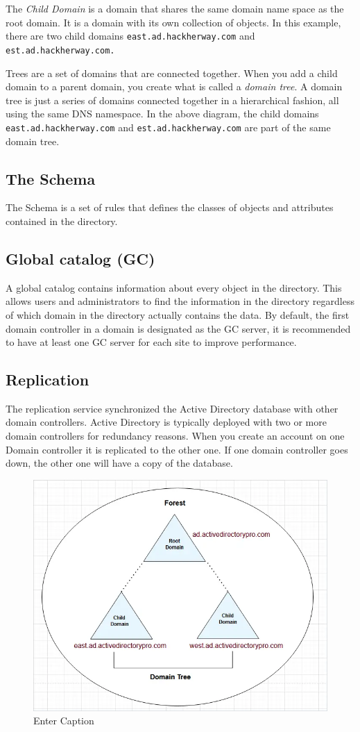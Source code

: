 The \textit{Child Domain} is a domain that shares the same domain name space as the root domain. It is a domain with its own collection of objects. In this example, there are two child domains \texttt{east.ad.hackherway.com} and \texttt{est.ad.hackherway.com.}

Trees are a set of domains that are connected together. When you add a child domain to a parent domain, you create what is called a \textit{domain tree}. A domain tree is just a series of domains connected together in a hierarchical fashion, all using the same DNS namespace. In the above diagram, the child domains \texttt{east.ad.hackherway.com} and \texttt{est.ad.hackherway.com} are part of the same domain tree.

\subsection{The Schema}
The Schema is a set of rules that defines the classes of objects and attributes contained in the directory.

\subsection{Global catalog (GC)}
A global catalog contains information about every object in the directory. This allows users and administrators to find the information in the directory regardless of which domain in the directory actually contains the data. By default, the first domain controller in a domain is designated as the GC server, it is recommended to have at least one GC server for each site to improve performance.

\subsection{Replication}
The replication service synchronized the Active Directory database with other domain controllers. Active Directory is typically deployed with two or more domain controllers for redundancy reasons. When you create an account on one Domain controller it is replicated to the other one. If one domain controller goes down, the other one will have a copy of the database.

\begin{figure}
    \centering
    \includegraphics[width=0.75\linewidth]{treesforest.png}
    \caption{Enter Caption}
    \label{fig:placeholder}
\end{figure}

